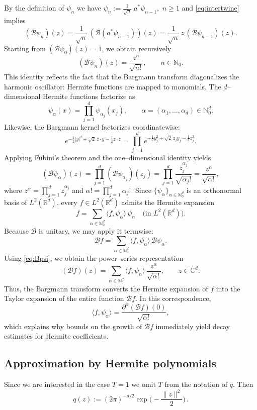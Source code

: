 \documentclass[11pt]{article}
\theoremstyle{remark}
\numberwithin{equation}{section}
\newcommand{\C}{\mathbb{C}}
\newcommand{\R}{\mathbb{R}}
\newcommand{\N}{\mathbb{N}}
\begin{document}
By the definition of $\psi_n$ we have \(\psi_n:=\frac{1}{\sqrt{n}}\;a^\ast\psi_{n-1},\)  \(n\ge1\) and \eqref{eq:intertwine} implies
\[
(\mathcal B\psi_n)(z)
=\frac{1}{\sqrt{n}}\,(\mathcal B(a^\ast\psi_{n-1}))(z)
=\frac{1}{\sqrt{n}}\,z\,(\mathcal B\psi_{n-1})(z).
\]
Starting from $(\mathcal B\psi_0)(z)=1$, we obtain recursively
\[
(\mathcal B\psi_n)(z)
=\frac{z^n}{\sqrt{n!}},
\qquad n\in\N_0.
\]
This identity reflects the fact that the Bargmann transform diagonalizes
the harmonic oscillator: Hermite functions are mapped to monomials.
The $d$--dimensional Hermite functions factorize as
\[
\psi_\alpha(x)=\prod_{j=1}^d \psi_{\alpha_j}(x_j),
\qquad \alpha=(\alpha_1,\dots,\alpha_d)\in\N_0^d.
\]
Likewise, the Bargmann kernel factorizes coordinatewise:
\[
e^{-\frac12|y|^2+\sqrt2\,z\cdot y-\frac12 z\cdot z}
=\prod_{j=1}^d
e^{-\frac12 y_j^2+\sqrt2\,z_j y_j-\frac12 z_j^2}.
\]
Applying Fubini's theorem and the one--dimensional identity yields
\begin{equation}
\label{eq:Bpsi}
 (\mathcal B\psi_\alpha)(z)
=\prod_{j=1}^d (\mathcal B\psi_{\alpha_j})(z_j)
=\prod_{j=1}^d \frac{z_j^{\alpha_j}}{\sqrt{\alpha_j!}}
=\frac{z^\alpha}{\sqrt{\alpha!}},   
\end{equation}
where $z^\alpha=\prod_{j=1}^d z_j^{\alpha_j}$ and
$\alpha!=\prod_{j=1}^d \alpha_j!$. 
Since $\{\psi_\alpha\}_{\alpha\in\N_0^d}$ is an orthonormal basis of $L^2(\R^d)$,
every $f\in L^2(\R^d)$ admits the Hermite expansion
\[
f=\sum_{\alpha\in\N_0^d}\langle f,\psi_\alpha\rangle\,\psi_\alpha
\quad\text{(in }L^2(\R^d)\text{)}.
\]
Because $\mathcal B$ is unitary, we may apply it termwise:
\[
\mathcal B f
=\sum_{\alpha\in\N_0^d}\langle f,\psi_\alpha\rangle\,\mathcal B\psi_\alpha.
\]
Using \eqref{eq:Bpsi}, we obtain the power--series representation
\[
(\mathcal B f)(z)
=\sum_{\alpha\in\N_0^d}\langle f,\psi_\alpha\rangle\,\frac{z^\alpha}{\sqrt{\alpha!}},
\qquad z\in\C^d.
\]
Thus, the Bargmann transform converts the Hermite expansion of $f$
into the Taylor expansion of the entire function $\mathcal B f$.
In this correspondence,
\[
\langle f,\psi_\alpha\rangle
=\frac{\partial^\alpha(\mathcal B f)(0)}{\sqrt{\alpha!}},
\]
which explains why bounds on the growth of $\mathcal B f$
immediately yield decay estimates for Hermite coefficients.


\subsection{Approximation by Hermite polynomials}
Since we are interested in the case $T = 1$ we omit $T$ from the notation of $q$. Then
$$
q(z):=(2\pi)^{-d/2}\exp\!\Big(-\frac{\|z\|^2}{2}\Big)\, .
$$
\end{document}
